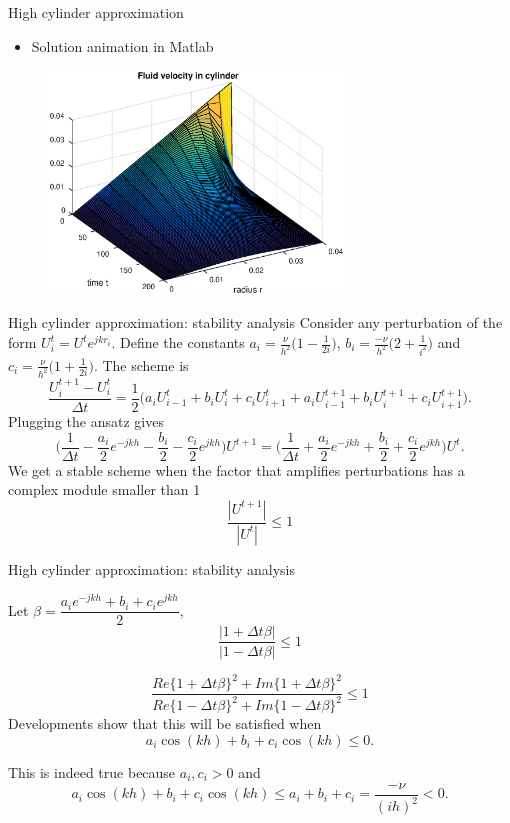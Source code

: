 \documentclass{beamer}
\begin{document}
\begin{frame}{High cylinder approximation}
\begin{itemize}
\item Solution animation in Matlab
\end{itemize}
\begin{figure}[!h]
\centering
\includegraphics[width = 0.7\textwidth]{./dim1.eps}
\end{figure}
\end{frame}

\begin{frame}{High cylinder approximation: stability analysis}
Consider any perturbation of the form $U_{i}^{t}= U^{t}e^{jkr_i}.$
Define the constants $a_i=\frac{\nu}{h^2}\Big(1-\frac{1}{2i}\Big)$, $b_i=\frac{-\nu}{h^2}\Big(2+\frac{1}{i^2}\Big)$ and $c_i=\frac{\nu}{h^2}\Big(1+\frac{1}{2i}\Big)$. The scheme is 
$$\frac{U_{i}^{t+1}-U_{i}^{t}}{\Delta t}=\frac{1}{2}\Big( a_{i}U_{i-1}^{t}
+b_{i}U_{i}^{t}+c_{i}U_{i+1}^{t}
+ a_{i}U_{i-1}^{t+1}
+b_{i}U_{i}^{t+1}+c_{i}U_{i+1}^{t+1}\Big).$$
Plugging the ansatz gives
$$\Big(\frac{1}{\Delta t} -\frac{a_i}{2}e^{-jkh} -\frac{b_i}{2} -\frac{c_i}{2}e^{jkh}\Big)U^{t+1}=\Big(\frac{1}{\Delta t} +\frac{a_i}{2}e^{-jkh} +\frac{b_i}{2} +\frac{c_i}{2}e^{jkh}\Big)U^{t} .$$
 We get a stable scheme when the factor that amplifies perturbations has a complex module smaller than 1
 $$\dfrac{|U^{t+1}|}{|U^t|}\leq 1$$
\end{frame}
\begin{frame}{High cylinder approximation: stability analysis}

Let $\beta = \dfrac{a_ie^{-jkh} +b_i +c_ie^{jkh}}{2}$,
$$\dfrac{|1+\Delta t \beta|}{|1-\Delta t \beta|}\leq 1$$

$$\dfrac{Re\{1+\Delta t \beta\}^2 + Im\{1+\Delta t \beta\}^2 }{Re\{1-\Delta t \beta\}^2 + Im\{1-\Delta t \beta\}^2}\leq 1$$
Developments show that this will be satisfied when
$$a_i\cos(kh)+b_i + c_i \cos(kh)\leq 0.$$

This is indeed true because $a_i, c_i >0$ and
$$a_i\cos(kh)+b_i + c_i \cos(kh)\leq a_i + b_i + c_i = \frac{-\nu}{(ih)^2}< 0.$$

\end{frame}
\end{document}
